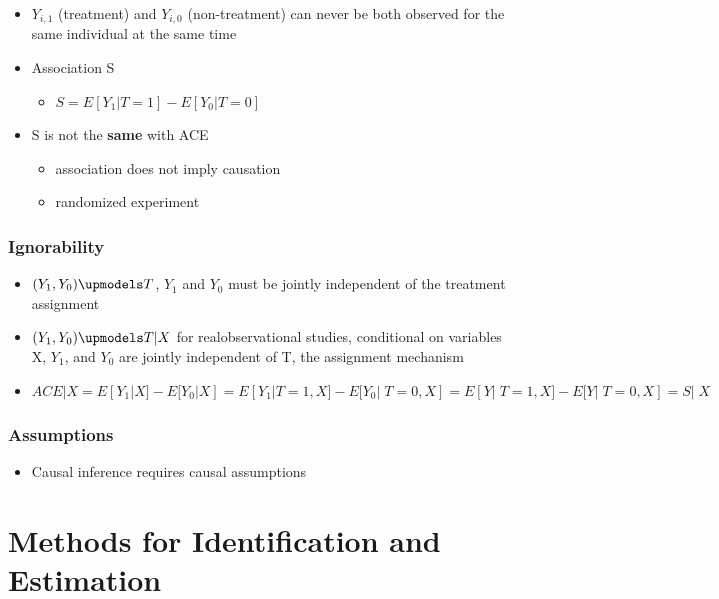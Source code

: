 \documentclass[]{book}
\providecommand{\tightlist}{%
  \setlength{\itemsep}{0pt}\setlength{\parskip}{0pt}}
\begin{document}
\begin{itemize}
\tightlist
\item
  \(Y_{i,1}\) (treatment) and \(Y_{i,0}\) (non-treatment) can never be both observed for the same individual at the same time
\item
  Association S

  \begin{itemize}
  \tightlist
  \item
    \(S = E[Y_1|T = 1] - E[Y_0|T = 0]\)
  \end{itemize}
\item
  S is not the \textbf{same} with ACE

  \begin{itemize}
  \tightlist
  \item
    association does not imply causation
  \item
    randomized experiment
  \end{itemize}
\end{itemize}

\hypertarget{ignorability}{%
\subsubsection{Ignorability}\label{ignorability}}

\begin{itemize}
\tightlist
\item
  \((Y_1,Y_0) \upmodels T\), \(Y_1\) and \(Y_0\) must be jointly independent of the treatment assignment
\item
  \((Y_1,Y_0) \upmodels T|X\) for realobservational studies, conditional on variables X, \(Y_1\), and \(Y_0\) are jointly independent of T, the assignment mechanism
\item
  \(ACE|X = E[Y_1|X] - E[Y_0|X] = E[Y_1|T=1,X] - E[Y_0|􏰀T = 0,X] = E[Y|􏰀T = 1,X] - E[Y|􏰀T =0,X] = S|􏰀X\)
\end{itemize}

\hypertarget{assumptions}{%
\subsubsection{Assumptions}\label{assumptions}}

\begin{itemize}
\tightlist
\item
  Causal inference requires causal assumptions
\end{itemize}

\hypertarget{methods-for-identification-and-estimation}{%
\section{Methods for Identification and Estimation}\label{methods-for-identification-and-estimation}}
\end{document}
